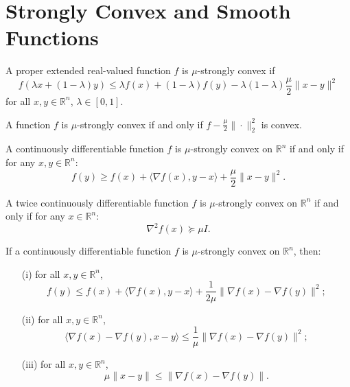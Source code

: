 \section{Strongly Convex and Smooth Functions}

\begin{definition}
  \label{def:strongly_convex}
  \leanok
  A proper extended real-valued function $f$ is $\mu$-strongly convex if
  \[
    f(\lambda x + (1-\lambda)y) \leq \lambda f(x) + (1-\lambda)f(y) - \lambda(1-\lambda)\frac{\mu}{2}\|x - y\|^2
  \]
  for all $x, y \in \mathbb{R}^n$, $\lambda \in [0,1]$.
\end{definition}

\begin{lemma}
  \label{lem:strongly_convex_char}
  \leanok
  A function $f$ is $\mu$-strongly convex if and only if $f - \frac{\mu}{2}\|\cdot\|_2^2$ is convex.
\end{lemma}

\begin{theorem}
  \label{thm:strongly_convex_first_order}
  \leanok
  A continuously differentiable function $f$ is $\mu$-strongly convex on $\mathbb{R}^n$ if and only if for any $x, y \in \mathbb{R}^n$:
  \[
    f(y) \geq f(x) + \langle\nabla f(x), y - x\rangle + \frac{\mu}{2}\|x - y\|^2.
  \]
\end{theorem}

\begin{theorem}
  \label{thm:strongly_convex_second_order}
  \leanok
  A twice continuously differentiable function $f$ is $\mu$-strongly convex on $\mathbb{R}^n$ if and only if for any $x \in \mathbb{R}^n$:
  \[
    \nabla^2 f(x) \succeq \mu I.
  \]
\end{theorem}

\begin{lemma}
  \label{lem:strongly_convex_props}
  \leanok
  If a continuously differentiable function $f$ is $\mu$-strongly convex on $\mathbb{R}^n$, then:
  \begin{enumerate}
    \item[(i)] for all $x, y \in \mathbb{R}^n$,
    \[
      f(y) \leq f(x) + \langle\nabla f(x), y - x\rangle + \frac{1}{2\mu}\|\nabla f(x) - \nabla f(y)\|^2;
    \]
    \item[(ii)] for all $x, y \in \mathbb{R}^n$,
    \[
      \langle\nabla f(x) - \nabla f(y), x - y\rangle \leq \frac{1}{\mu}\|\nabla f(x) - \nabla f(y)\|^2;
    \]
    \item[(iii)] for all $x, y \in \mathbb{R}^n$,
    \[
      \mu\|x - y\| \leq \|\nabla f(x) - \nabla f(y)\|.
    \]
  \end{enumerate}
\end{lemma}

